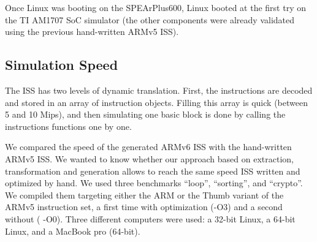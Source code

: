 \documentclass[conference]{ieeeconf}
\begin{document}
Once Linux was booting on the SPEArPlus600, Linux booted at the first try on the
TI AM1707 SoC simulator (the other components were already validated using the previous
hand-written ARMv5 ISS).

\subsection{Simulation Speed}

The ISS has two levels of dynamic translation. First, the instructions are
decoded and stored in an array of instruction objects. Filling this array is
quick (between 5 and 10 Mips), and then simulating one basic block is done by
calling the instructions functions one by one.


We compared the speed of the generated ARMv6 ISS with the hand-written ARMv5
ISS. We wanted to know whether our approach based on extraction, transformation
and generation allows to reach the same speed ISS written and optimized by
hand.
We used three benchmarks ``loop'', ``sorting'', and ``crypto''. We compiled them
targeting either the ARM or the Thumb variant of the ARMv5 instruction set, a
first time with optimization ({\stt -O3}) and a second without ({\stt
  -O0}). Three different computers were used: a 32-bit Linux, a 64-bit Linux,
and a MacBook pro (64-bit).
\end{document}
